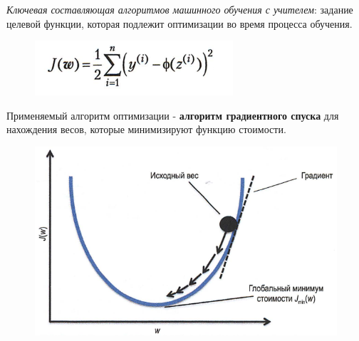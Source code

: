 \documentclass{beamer}
\begin{document}
\begin{frame}[t]
\textit{Ключевая составляющая алгоритмов машинного обучения с учителем}: задание целевой функции, которая подлежит оптимизации во время процесса обучения.
\begin{figure}[h]
\centering
\includegraphics[scale=0.6]{images/lec03-pic20.png}
\end{figure}
Применяемый алгоритм оптимизации - \textbf{алгоритм градиентного спуска} для нахождения весов, которые минимизируют функцию стоимости.
\begin{figure}[h]
\centering
\includegraphics[scale=0.4]{images/lec03-pic21.png}
\end{figure}
\end{frame}
\end{document}
